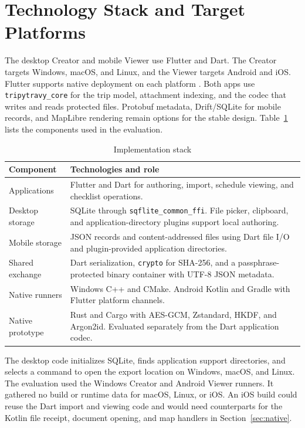 \section{Technology Stack and Target Platforms}
\label{sec:stack}
The desktop Creator and mobile Viewer use Flutter and Dart. The Creator targets Windows, macOS, and Linux, and the Viewer targets Android and iOS. Flutter supports native deployment on each platform \cite{flutterplatforms}. Both apps use \texttt{tripytravy\_core} for the trip model, attachment indexing, and the codec that writes and reads protected files. Protobuf metadata, Drift/SQLite for mobile records, and MapLibre rendering remain options for the stable design. Table~\ref{tab:stack} lists the components used in the evaluation.

\begin{table}[t]
\caption{Implementation stack}
\label{tab:stack}
\centering
\small
\renewcommand{\arraystretch}{1.12}
\begin{tabularx}{\columnwidth}{@{}>{\raggedright\arraybackslash}p{}>{\raggedright\arraybackslash}X@{}}
\toprule
Component & Technologies and role \\
\midrule
Applications & Flutter and Dart for authoring, import, schedule viewing, and checklist operations. \\
Desktop storage & SQLite through \texttt{sqflite\_common\_ffi}. File picker, clipboard, and application-directory plugins support local authoring. \\
Mobile storage & JSON records and content-addressed files using Dart file I/O and plugin-provided application directories. \\
Shared exchange & Dart serialization, \texttt{crypto} for SHA-256, and a passphrase-protected binary container with UTF-8 JSON metadata. \\
Native runners & Windows C++ and CMake. Android Kotlin and Gradle with Flutter platform channels. \\
Native prototype & Rust and Cargo with AES-GCM, Zstandard, HKDF, and Argon2id. Evaluated separately from the Dart application codec. \\
\bottomrule
\end{tabularx}
\end{table}

The desktop code initializes SQLite, finds application support directories, and selects a command to open the export location on Windows, macOS, and Linux. The evaluation used the Windows Creator and Android Viewer runners. It gathered no build or runtime data for macOS, Linux, or iOS. An iOS build could reuse the Dart import and viewing code and would need counterparts for the Kotlin file receipt, document opening, and map handlers in Section~\ref{sec:native}.
